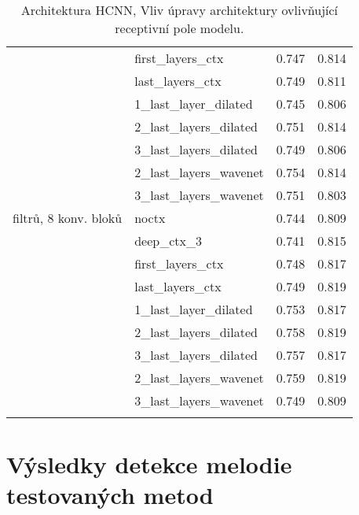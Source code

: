 \documentclass[12pt,a4paper]{report}
\begin{document}
\begin{table}[h]
\begin{tabular}{llrr}
{} & first\_layers\_ctx & 0.747 & 0.814 \\
{} & last\_layers\_ctx & 0.749 & 0.811 \\
{} & 1\_last\_layer\_dilated & 0.745 & 0.806 \\
{} & 2\_last\_layers\_dilated & 0.751 & 0.814 \\
{} & 3\_last\_layers\_dilated & 0.749 & 0.806 \\
{} & 2\_last\_layers\_wavenet & 0.754 & 0.814 \\
{} & 3\_last\_layers\_wavenet & 0.751 & 0.803 \\
\arrayrulecolor{black!30}\midrule
16 filtrů, 8 konv. bloků & noctx & 0.744 & 0.809 \\
{} & deep\_ctx\_3 & 0.741 & 0.815 \\
{} & first\_layers\_ctx & 0.748 & 0.817 \\
{} & last\_layers\_ctx & 0.749 & 0.819 \\
{} & 1\_last\_layer\_dilated & 0.753 & 0.817 \\
{} & 2\_last\_layers\_dilated & 0.758 & 0.819 \\
{} & 3\_last\_layers\_dilated & 0.757 & 0.817 \\
{} & 2\_last\_layers\_wavenet & 0.759 & 0.819 \\
{} & 3\_last\_layers\_wavenet & 0.749 & 0.809 \\
\arrayrulecolor{black}\bottomrule
    \end{tabular}
\caption{Architektura HCNN, Vliv úpravy architektury ovlivňující receptivní pole modelu.}\label{tab:spectrogram_ctx_archs}
\end{table}

\section{Výsledky detekce melodie testovaných metod}\label{appendix:voicing}
\end{document}
